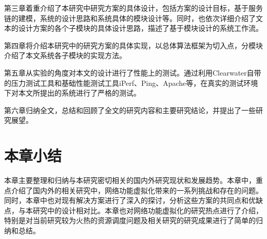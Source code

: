 第三章着重介绍了本研究中研究方案的具体设计，包括方案的设计目标，基于服务链的建模，系统的设计思路和系统具体的模块设计等。同时，也依次详细介绍了文本的设计方案的各个子模块的具体设计思路，描述了基于模块设计的系统工作流。

第四章将介绍本研究中的研究方案的具体实现，以总体算法框架为切入点，分模块介绍了本文系统各子模块的实现方法。

第五章从实验的角度对本文的设计进行了性能上的测试。通过利用Clearwater自带的压力测试工具和基础性能测试工具iPerf、Ping、Apache等，在真实的测试环境下对本文所提出的系统进行了严格的测试。

第六章归纳全文，总结和回顾了全文的研究内容和主要研究结论，并提出了一些研究展望。

\section{本章小结}
本章主要整理和归纳与本研究密切相关的国内外研究现状和发展趋势。本章中，重点介绍了国内外的相关研究中，网络功能虚拟化带来的一系列挑战和存在的问题。同时，本章中也对现有解决方案进行了深入的探讨，分析这些方案的共同点和优缺点，与本研究中的设计相对比。本章也对网络功能虚拟化的研究热点进行了介绍，特别是对当前研究较为火热的资源调度问题及相关研究的研究成果进行了简单的归纳和总结。